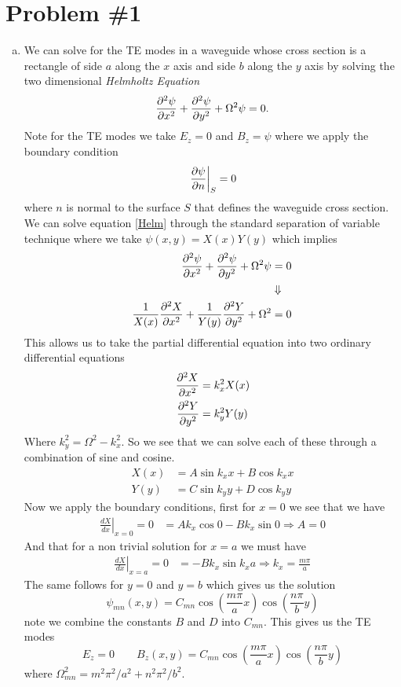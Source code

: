 \documentclass[11pt]{article}
\numberwithin{equation}{section}
\begin{document}


\section{Problem \#1}
\begin{enumerate}[(a)]
\item
    We can solve for the TE modes in a waveguide whose cross section is a rectangle of side $a$ along the $x$ axis
    and side $b$ along the $y$ axis by solving the two dimensional \emph{Helmholtz Equation}
    \begin{equation}
        \frac{\partial{^2\psi}}{\partial{x^2}} + \frac{\partial{^2\psi}}{\partial{y^2}} + \Omega^2\psi = 0.
    \label{Helm}
    \end{equation}
    Note for the TE modes we take $E_z=0$ and $B_z=\psi$ where we apply the boundary condition 
    $$\left.\frac{\partial{\psi}}{\partial{n}}\right|_{S} = 0$$
    where $n$ is normal to the surface $S$ that defines the waveguide cross section. We can solve equation \ref{Helm}
    through the standard separation of variable technique where we take $\psi(x,y) = X(x)Y(y)$ which implies
    \begin{align*}
        \frac{\partial{^2\psi}}{\partial{x^2}} + \frac{\partial{^2\psi}}{\partial{y^2}} + \Omega^2\psi &= 0 \\
                                                                       &\Downarrow\\
        \frac{1}{X(x)}\frac{\partial{^2X}}{\partial{x^2}} + \frac{1}{Y(y)}\frac{\partial{^2Y}}{\partial{y^2}} + \Omega^2 &= 0 
    \end{align*}
    This allows us to take the partial differential equation into two ordinary differential equations
    \begin{align*}
        \frac{\partial{^2X}}{\partial{x^2}} &= k_x^2X(x)\\
        \frac{\partial{^2Y}}{\partial{y^2}} &= k_y^2Y(y)
    \end{align*}
    Where $k_y^2 = \Omega^2-k_x^2$. So we see that we can solve each of these through a combination of sine and 
    cosine.
    \begin{align*}
        X(x) &= A\sin{k_xx} + B\cos{k_xx}\\
        Y(y) &= C\sin{k_yy} + D\cos{k_yy}
    \end{align*}
    Now we apply the boundary conditions, first for $x=0$ we see that we have
    \begin{align*}
        \left.\frac{dX}{dx}\right|_{x=0} = 0 &= Ak_x\cos{0} - Bk_x\sin{0} \Rightarrow A = 0
    \end{align*}
    And that for a non trivial solution for $x=a$ we must have
    \begin{align*}
        \left.\frac{dX}{dx}\right|_{x=a} = 0 &=  -Bk_x\sin{k_xa} \Rightarrow k_x = \frac{m\pi}{a}
    \end{align*}
    The same follows for $y=0$ and $y=b$ which gives us the solution
    $$\psi_{mn}(x,y) = C_{mn}\cos\left(\frac{m\pi}{a}x\right)\cos\left(\frac{n\pi}{b}y\right)$$
    note we combine the constants $B$ and $D$ into $C_{mn}$. This gives us the TE modes
    $$E_{z} = 0\qquad B_z(x,y) = C_{mn}\cos\left(\frac{m\pi}{a}x\right)\cos\left(\frac{n\pi}{b}y\right)$$
    where $\Omega^2_{mn} = m^2\pi^2/a^2 + n^2\pi^2/b^2$.


\end{enumerate}
\end{document}
